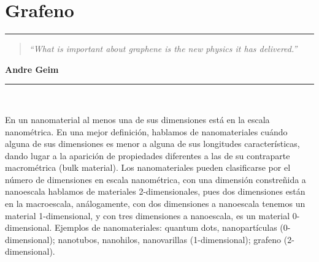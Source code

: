 \chapter{\label{cap:2}Grafeno}

\noindent
\rule{\linewidth}{1 pt}
\begin{flushright}
\begin{quotation}
\small{
\textit{``What is important about graphene is the new physics it has delivered.''}}
\end{quotation}
\bf{Andre Geim}
\end{flushright}
\noindent
\rule{\linewidth}{1 pt}\\
\vspace{1cm}

En un nanomaterial al menos una de sus dimensiones está en la escala nanométrica. En una mejor definición, hablamos de nanomateriales cuándo alguna de sus dimensiones es menor a alguna de sus longitudes características, dando lugar a la aparición de propiedades diferentes a las de su contraparte macrométrica (bulk material). Los nanomateriales pueden clasificarse por el número de dimensiones en escala nanométrica, con una dimensión constreñida a nanoescala hablamos de materiales 2-dimensionales, pues dos dimensiones están en la macroescala, análogamente, con dos dimensiones a nanoescala tenemos un material 1-dimensional, y con tres dimensiones a nanoescala, es un material 0-dimensional. Ejemplos de nanomateriales: quantum dots,  nanopartículas (0-dimensional); nanotubos, nanohilos, nanovarillas (1-dimensional); grafeno (2-dimensional).